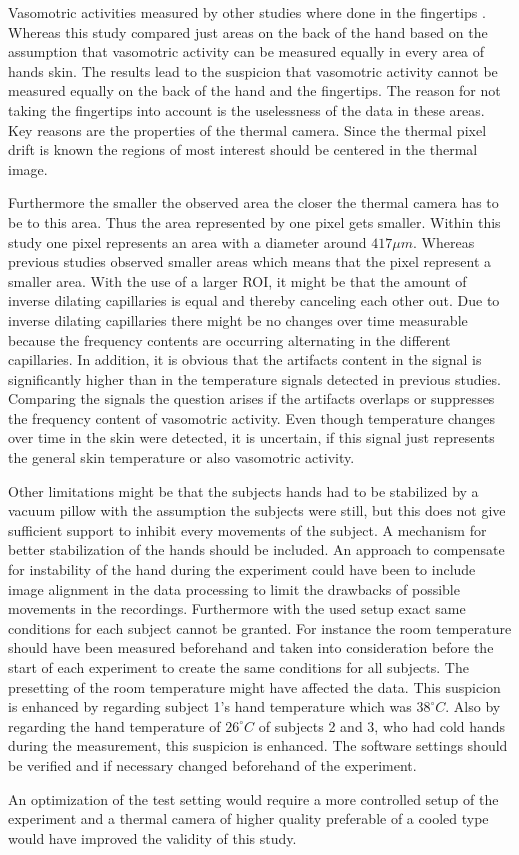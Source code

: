 Vasomotric activities measured by other studies where done in the fingertips \cite{sagaidachnyi2012a, sagaidachnyi2014}. Whereas this study compared just areas on the back of the hand based on the assumption that vasomotric activity can be measured equally in every area of hands skin. The results lead to the suspicion that vasomotric activity cannot be measured equally on the back of the hand and the fingertips. The reason for not taking the fingertips into account is the uselessness of the data in these areas. Key reasons are the properties of the thermal camera. Since the thermal pixel drift is known the regions of most interest should be centered in the thermal image. 

Furthermore the smaller the observed area the closer the thermal camera has to be to this area. Thus the area represented by one pixel gets smaller. Within this study one pixel represents an area with a diameter around $417 \mu m$. Whereas previous studies observed smaller areas which means that the pixel represent a smaller area. With the use of a larger ROI, it might be that the amount of inverse dilating capillaries is equal and thereby canceling each other out. Due to inverse dilating capillaries there might be no changes over time measurable because the frequency contents are occurring alternating in the different capillaries. In addition, it is obvious that the artifacts content in the signal is significantly higher than in the temperature signals detected in previous studies. Comparing the signals the question arises if the artifacts overlaps or suppresses the frequency content of vasomotric activity. Even though temperature changes over time in the skin were detected, it is uncertain, if this signal just represents the general skin temperature or also vasomotric activity. %

Other limitations might be that the subjects hands had to be stabilized by a vacuum pillow with the assumption the subjects were still, but this does not give sufficient support to inhibit every movements of the subject.  A mechanism for better stabilization of the hands should be included. An approach to compensate for instability of the hand during the experiment could have been to include image alignment in the data processing to limit the drawbacks of possible movements in the recordings. Furthermore with the used setup exact same conditions for each subject cannot be granted. For instance the room temperature should have been measured beforehand and taken into consideration before the start of each experiment to create the same conditions for all subjects. The presetting of the room temperature might have affected the data. This suspicion is enhanced by regarding subject 1's hand temperature which was $38^\circ C$. Also by regarding the hand temperature of $26^\circ C$ of subjects 2 and 3, who had cold hands during the measurement, this suspicion is enhanced. The software settings should be verified and if necessary changed beforehand of the experiment.

An optimization of the test setting would require a more controlled setup of the experiment and a thermal camera of higher quality preferable of a cooled type would have improved the validity of this study.